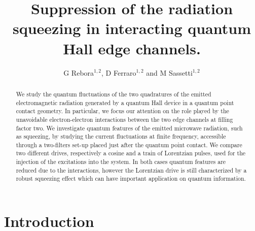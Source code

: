 \documentclass[12pt]{iopart}
\begin{document}
\title{Suppression of the radiation squeezing in interacting quantum Hall edge channels.}

\author{G Rebora$^{1,2}$, D Ferraro$^{1,2}$ and M Sassetti$^{1,2}$}

\address{$^{1}$Dipartimento di Fisica, Universit\`a di Genova, Via Dodecaneso 33, 16146, Genova, Italy}
\address{$^{2}$SPIN-CNR, Via Dodecaneso 33, 16146 Genova, Italy}

\begin{abstract}
We study the quantum fluctuations of the two quadratures of the emitted electromagnetic radiation generated by a quantum Hall device in a quantum point contact geometry. In particular, we focus our attention on the role played by the unavoidable electron-electron interactions between the two edge channels at filling factor two. We investigate quantum features of the emitted microwave radiation, such as  squeezing, by studying the current fluctuations at finite frequency, accessible through a two-filters set-up placed just after the quantum point contact. We compare two different drives, respectively a cosine and a train of Lorentzian pulses, used for the injection of the excitations into the system. In both cases quantum features are reduced due to the interactions, however the Lorentzian drive is still characterized by a robust squeezing effect which can have important application on quantum information.
\end{abstract}


\section{Introduction}
 
\end{document}
